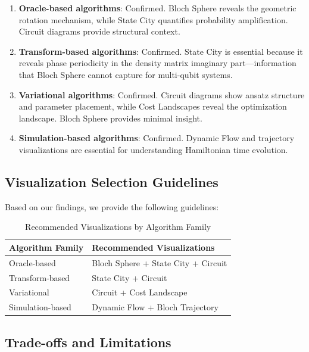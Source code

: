 \documentclass[12pt,a4paper]{article}
\begin{document}
\begin{enumerate}
	\item \textbf{Oracle-based algorithms}: Confirmed. Bloch Sphere reveals the geometric rotation mechanism, while State City quantifies probability amplification. Circuit diagrams provide structural context.

	\item \textbf{Transform-based algorithms}: Confirmed. State City is essential because it reveals phase periodicity in the density matrix imaginary part—information that Bloch Sphere cannot capture for multi-qubit systems.

	\item \textbf{Variational algorithms}: Confirmed. Circuit diagrams show ansatz structure and parameter placement, while Cost Landscapes reveal the optimization landscape. Bloch Sphere provides minimal insight.

	\item \textbf{Simulation-based algorithms}: Confirmed. Dynamic Flow and trajectory visualizations are essential for understanding Hamiltonian time evolution.
\end{enumerate}

\subsection{Visualization Selection Guidelines}

Based on our findings, we provide the following guidelines:

\begin{table}[h!]
	\centering
	\caption{Recommended Visualizations by Algorithm Family}
	\label{tab:guidelines}
	\begin{tabular}{@{}ll@{}}
		\toprule
		\textbf{Algorithm Family} & \textbf{Recommended Visualizations} \\ \midrule
		Oracle-based              & Bloch Sphere + State City + Circuit \\
		Transform-based           & State City + Circuit                \\
		Variational               & Circuit + Cost Landscape            \\
		Simulation-based          & Dynamic Flow + Bloch Trajectory     \\ \bottomrule
	\end{tabular}
\end{table}

\subsection{Trade-offs and Limitations}
\end{document}
